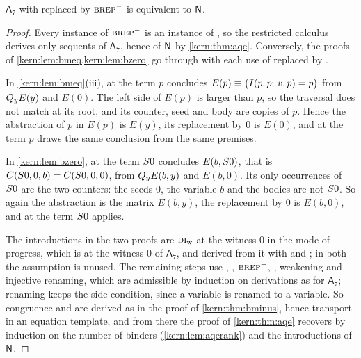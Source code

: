 \begin{theorem}
\label{kern:thm:aqeminus}
$\mathsf{A}_7$ with  replaced by $\rulename{BRep}^{-}$ is
equivalent to $\mathsf{N}$.
\end{theorem}

\begin{proof}
Every instance of $\rulename{BRep}^{-}$ is an instance of , so
the restricted calculus derives only sequents of $\mathsf{A}_7$, hence of
$\mathsf{N}$ by \cref{kern:thm:aqe}.  Conversely, the proofs of
\cref{kern:lem:bmeq,kern:lem:bzero} go through with each use of
 replaced by .

In \cref{kern:lem:bmeq}(iii),  at the term $p$ concludes
$E(p)\equiv\bigl(I(p,p;\,v.\,p)=p\bigr)$ from $Q_{y}E(y)$ and $E(0)$.  The
left side of $E(p)$ is larger than $p$, so the traversal does not match at its
root, and its counter, seed and body are copies of $p$.  Hence the abstraction
of $p$ in $E(p)$ is $E(y)$, its replacement by $0$ is $E(0)$, and
 at the term $p$ draws the same conclusion from the same
premises.

In \cref{kern:lem:bzero},  at the term $S 0$ concludes
$E(b,S 0)$, that is $C(S 0,0,b)=C(S 0,0,0)$, from $Q_{y}E(b,y)$ and
$E(b,0)$.  Its only occurrences of $S 0$ are the two counters: the seeds
$0$, the variable $b$ and the bodies are not $S 0$.  So again the
abstraction is the matrix $E(b,y)$, the replacement by $0$ is $E(b,0)$, and
 at the term $S 0$ applies.

The introductions in the two proofs are $\rulename{DI}_{\mathrm{w}}$ at the
witness $0$ in the mode of progress, which is  at the witness $0$
of $\mathsf{A}_7$, and  derived from it with  and
; in both the assumption is unused.  The remaining steps use
, , $\rulename{BRep}^{-}$, , weakening
and injective renaming, which are admissible by induction on derivations as
for $\mathsf{A}_7$; renaming keeps the side condition, since a variable is
renamed to a variable.  So congruence and  are derived as in the
proof of \cref{kern:thm:bminus}, hence transport in an equation template, and
from there the proof of \cref{kern:thm:aqe} recovers  by
induction on the number of binders (\cref{kern:lem:aqerank}) and the
introductions of $\mathsf{N}$.
\end{proof}

